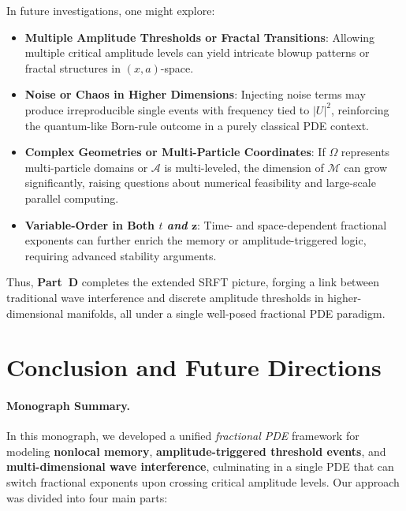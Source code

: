 \documentclass[12pt]{article}
\begin{document}
\medskip

\noindent
In future investigations, one might explore:
\begin{itemize}
    \item \textbf{Multiple Amplitude Thresholds or Fractal Transitions}: 
          Allowing multiple critical amplitude levels can yield intricate blowup patterns 
          or fractal structures in $(x,a)$-space.
    \item \textbf{Noise or Chaos in Higher Dimensions}: 
          Injecting noise terms may produce irreproducible single events with frequency 
          tied to $|U|^2$, reinforcing the quantum-like Born-rule outcome in a purely 
          classical PDE context.
    \item \textbf{Complex Geometries or Multi-Particle Coordinates}: 
          If $\Omega$ represents multi-particle domains or $\mathcal{A}$ is multi-leveled, 
          the dimension of $\mathcal{M}$ can grow significantly, raising questions about 
          numerical feasibility and large-scale parallel computing.
    \item \textbf{Variable-Order in Both \(t\) \emph{and} \(\mathbf{z}\)}: 
          Time- and space-dependent fractional exponents can further enrich the memory or 
          amplitude-triggered logic, requiring advanced stability arguments.
\end{itemize}

Thus, \textbf{Part~D} completes the extended SRFT picture, forging a link between traditional 
wave interference and discrete amplitude thresholds in higher-dimensional manifolds, all 
under a single well-posed fractional PDE paradigm.

\section*{Conclusion and Future Directions}
\label{sec:conclusion_monograph}

\paragraph{Monograph Summary.}
In this monograph, we developed a unified \emph{fractional PDE} framework for modeling 
\textbf{nonlocal memory}, \textbf{amplitude-triggered threshold events}, and 
\textbf{multi-dimensional wave interference}, culminating in a single PDE that can switch 
fractional exponents upon crossing critical amplitude levels. Our approach was divided into 
four main parts:
\end{document}
